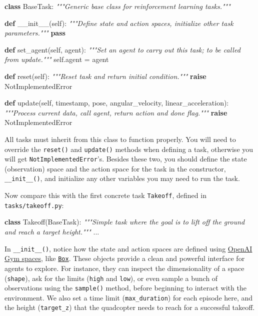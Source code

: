 \documentclass[11pt]{article}
\newenvironment{Shaded}{}{}
\newcommand{\KeywordTok}[1]{\textcolor[rgb]{0.00,0.44,0.13}{\textbf{{#1}}}}
\newcommand{\CommentTok}[1]{\textcolor[rgb]{0.38,0.63,0.69}{\textit{{#1}}}}
\newcommand{\FunctionTok}[1]{\textcolor[rgb]{0.02,0.16,0.49}{{#1}}}
\newcommand{\NormalTok}[1]{{#1}}
\newcommand{\VariableTok}[1]{\textcolor[rgb]{0.10,0.09,0.49}{{#1}}}
\newcommand{\ControlFlowTok}[1]{\textcolor[rgb]{0.00,0.44,0.13}{\textbf{{#1}}}}
\newcommand{\OperatorTok}[1]{\textcolor[rgb]{0.40,0.40,0.40}{{#1}}}
\newcommand{\PreprocessorTok}[1]{\textcolor[rgb]{0.74,0.48,0.00}{{#1}}}
\begin{document}
\begin{Shaded}
\begin{Highlighting}[]
\KeywordTok{class}\NormalTok{ BaseTask:}
    \CommentTok{"""Generic base class for reinforcement learning tasks."""}

    \KeywordTok{def} \FunctionTok{__init__}\NormalTok{(}\VariableTok{self}\NormalTok{):}
        \CommentTok{"""Define state and action spaces, initialize other task parameters."""}
        \ControlFlowTok{pass}
    
    \KeywordTok{def}\NormalTok{ set_agent(}\VariableTok{self}\NormalTok{, agent):}
        \CommentTok{"""Set an agent to carry out this task; to be called from update."""}
        \VariableTok{self}\NormalTok{.agent }\OperatorTok{=}\NormalTok{ agent}
    
    \KeywordTok{def}\NormalTok{ reset(}\VariableTok{self}\NormalTok{):}
        \CommentTok{"""Reset task and return initial condition."""}
        \ControlFlowTok{raise} \PreprocessorTok{NotImplementedError}
    
    \KeywordTok{def}\NormalTok{ update(}\VariableTok{self}\NormalTok{, timestamp, pose, angular_velocity, linear_acceleration):}
        \CommentTok{"""Process current data, call agent, return action and done flag."""}
        \ControlFlowTok{raise} \PreprocessorTok{NotImplementedError}            
\end{Highlighting}
\end{Shaded}

All tasks must inherit from this class to function properly. You will
need to override the \texttt{reset()} and \texttt{update()} methods when
defining a task, otherwise you will get \texttt{NotImplementedError}'s.
Besides these two, you should define the state (observation) space and
the action space for the task in the constructor,
\texttt{\_\_init\_\_()}, and initialize any other variables you may need
to run the task.

Now compare this with the first concrete task \texttt{Takeoff}, defined
in \texttt{tasks/takeoff.py}:

\begin{Shaded}
\begin{Highlighting}[]
\KeywordTok{class}\NormalTok{ Takeoff(BaseTask):}
    \CommentTok{"""Simple task where the goal is to lift off the ground and reach a target height."""}
\NormalTok{    ...}
\end{Highlighting}
\end{Shaded}

In \texttt{\_\_init\_\_()}, notice how the state and action spaces are
defined using \href{https://gym.openai.com/docs/\#spaces}{OpenAI Gym
spaces}, like
\href{https://github.com/openai/gym/blob/master/gym/spaces/box.py}{\texttt{Box}}.
These objects provide a clean and powerful interface for agents to
explore. For instance, they can inspect the dimensionality of a space
(\texttt{shape}), ask for the limits (\texttt{high} and \texttt{low}),
or even sample a bunch of observations using the \texttt{sample()}
method, before beginning to interact with the environment. We also set a
time limit (\texttt{max\_duration}) for each episode here, and the
height (\texttt{target\_z}) that the quadcopter needs to reach for a
successful takeoff.
\end{document}
